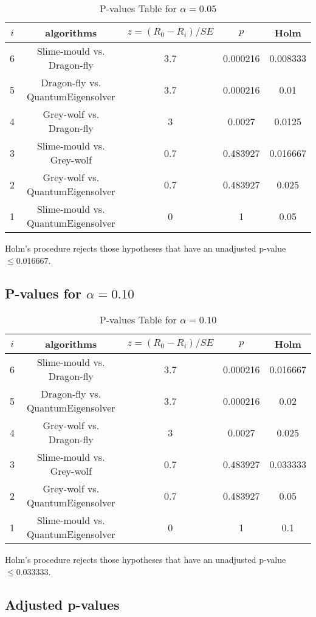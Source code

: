 \documentclass[a4paper,10pt]{article}
\begin{document}
\begin{landscape}
\begin{table}[!htp]
\centering\scriptsize
\begin{tabular}{ccccc}
$i$&algorithms&$z=(R_0 - R_i)/SE$&$p$&Holm\\
\hline6&Slime-mould vs. Dragon-fly&3.7&0.000216&0.008333\\
5&Dragon-fly vs. QuantumEigensolver&3.7&0.000216&0.01\\
4&Grey-wolf vs. Dragon-fly&3&0.0027&0.0125\\
3&Slime-mould vs. Grey-wolf&0.7&0.483927&0.016667\\
2&Grey-wolf vs. QuantumEigensolver&0.7&0.483927&0.025\\
1&Slime-mould vs. QuantumEigensolver&0&1&0.05\\
\hline
\end{tabular}
\caption{P-values Table for $\alpha=0.05$}
\end{table}Holm's procedure rejects those hypotheses that have an unadjusted p-value $\le0.016667$.

\pagebreak

\subsection{P-values for $\alpha=0.10$}

\begin{table}[!htp]
\centering\scriptsize
\begin{tabular}{ccccc}
$i$&algorithms&$z=(R_0 - R_i)/SE$&$p$&Holm\\
\hline6&Slime-mould vs. Dragon-fly&3.7&0.000216&0.016667\\
5&Dragon-fly vs. QuantumEigensolver&3.7&0.000216&0.02\\
4&Grey-wolf vs. Dragon-fly&3&0.0027&0.025\\
3&Slime-mould vs. Grey-wolf&0.7&0.483927&0.033333\\
2&Grey-wolf vs. QuantumEigensolver&0.7&0.483927&0.05\\
1&Slime-mould vs. QuantumEigensolver&0&1&0.1\\
\hline
\end{tabular}
\caption{P-values Table for $\alpha=0.10$}
\end{table}Holm's procedure rejects those hypotheses that have an unadjusted p-value $\le0.033333$.

\pagebreak

\subsection{Adjusted p-values}


\end{landscape}
\end{document}
